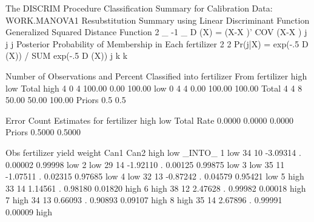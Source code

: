 \documentclass{article}
\begin{document}
\begin{Woutput}
The DISCRIM Procedure
Classification Summary for Calibration Data: WORK.MANOVA1
Resubstitution Summary using Linear Discriminant Function
Generalized Squared Distance Function
 2         _       -1   _
D (X) = (X-X )' COV  (X-X )
 j          j            j
Posterior Probability of Membership in Each fertilizer
                   2                    2
Pr(j|X) = exp(-.5 D (X)) / SUM exp(-.5 D (X))
                   j        k           k

Number of Observations and Percent Classified into fertilizer
From
fertilizer         high          low        Total
high                  4            0            4
                 100.00         0.00       100.00
low                   0            4            4
                   0.00       100.00       100.00
Total                 4            4            8
                  50.00        50.00       100.00
Priors              0.5          0.5

      Error Count Estimates for fertilizer
                    high         low       Total
Rate              0.0000      0.0000      0.0000
Priors            0.5000      0.5000

Obs    fertilizer    yield    weight      Can1      Can2      high       low      _INTO_
 1        low          34       10      -3.09314      .     0.00002    0.99998     low
 2        low          29       14      -1.92110      .     0.00125    0.99875     low
 3        low          35       11      -1.07511      .     0.02315    0.97685     low
 4        low          32       13      -0.87242      .     0.04579    0.95421     low
 5        high         33       14       1.14561      .     0.98180    0.01820     high
 6        high         38       12       2.47628      .     0.99982    0.00018     high
 7        high         34       13       0.66093      .     0.90893    0.09107     high
 8        high         35       14       2.67896      .     0.99991    0.00009     high
\end{Woutput}
\end{document}
